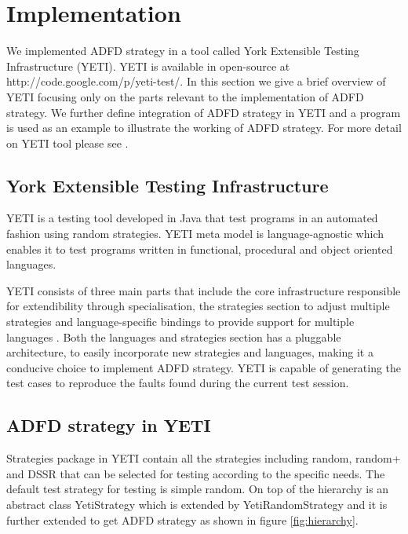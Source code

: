 \documentclass{acm_proc_article-sp}
\begin{document}

\section{Implementation}\label{sec:implementation}
 We implemented ADFD strategy in a tool called York Extensible Testing Infrastructure (YETI). YETI is available in open-source at http://code.google.com/p/yeti-test/. In this section we give a brief overview of YETI focusing only on the parts relevant to the implementation of ADFD strategy. We further define integration of ADFD strategy in YETI and a program is used as an example to illustrate the working of ADFD strategy. For more detail on YETI tool please see \cite{Oriol2010, Oriol2010a, Oriol2010b, Oriol2011, Oriol2012}.

 \subsection{York Extensible Testing Infrastructure}
YETI is a testing tool developed in Java that test programs in an automated fashion using random strategies. YETI meta model is language-agnostic which enables it to test programs written in functional, procedural and object oriented languages.

YETI consists of three main parts that include the core infrastructure responsible for extendibility through specialisation, the strategies section to adjust multiple strategies and language-specific bindings to provide support for multiple languages \cite{Oriol2010, Oriol2010b}. Both the languages and strategies section has a pluggable architecture, to easily incorporate new strategies and languages, making it a conducive choice to implement ADFD strategy. YETI is capable of generating the test cases to reproduce the faults found during the current test session.
 
 \subsection{ADFD strategy in YETI}
Strategies package in YETI contain all the strategies including random, random+ and DSSR that can be selected for testing according to the specific needs. The default test strategy for testing is simple random. On top of the hierarchy is an abstract class YetiStrategy which is extended by YetiRandomStrategy and it is further extended to get ADFD strategy as shown in figure \ref{fig:hierarchy}. 
 
\end{document}
